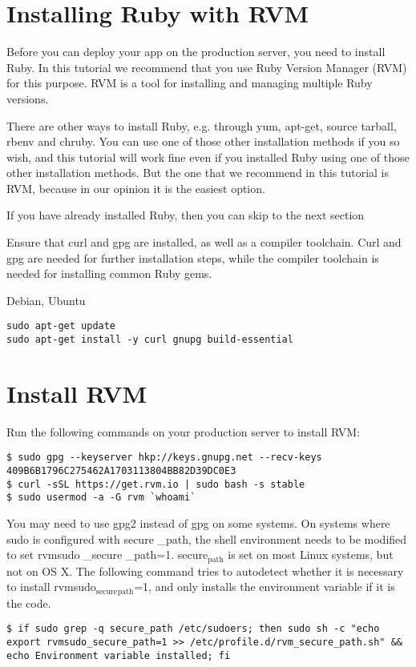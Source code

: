 \documentclass[11pt]{article}
\author{Justin}
\date{\today}
\title{}
\begin{document}
\tableofcontents

\section{Installing Ruby with RVM}
\label{sec:org7777b3d}
Before you can deploy your app on the production server, you need to install Ruby. In this tutorial we recommend that you use Ruby Version Manager (RVM) for this purpose. RVM is a tool for installing and managing multiple Ruby versions.

There are other ways to install Ruby, e.g. through yum, apt-get, source tarball, rbenv and chruby. You can use one of those other installation methods if you so wish, and this tutorial will work fine even if you installed Ruby using one of those other installation methods. But the one that we recommend in this tutorial is RVM, because in our opinion it is the easiest option.

If you have already installed Ruby, then you can skip to the next section

Ensure that curl and gpg are installed, as well as a compiler toolchain. Curl and gpg are needed for further installation steps, while the compiler toolchain is needed for installing common Ruby gems.

Debian, Ubuntu	
\begin{verbatim}
sudo apt-get update
sudo apt-get install -y curl gnupg build-essential
\end{verbatim}
\section{Install RVM}
\label{sec:org85ccdf1}

Run the following commands on your production server to install RVM:

\begin{verbatim}
$ sudo gpg --keyserver hkp://keys.gnupg.net --recv-keys 409B6B1796C275462A1703113804BB82D39DC0E3
$ curl -sSL https://get.rvm.io | sudo bash -s stable
$ sudo usermod -a -G rvm `whoami`
\end{verbatim}

You may need to use gpg2 instead of gpg on some systems.
On systems where sudo is configured with secure \_path, the shell environment needs to be modified to set rvmsudo \_secure \_path=1. secure\(_{\text{path}}\) is set on most Linux systems, but not on OS X. The following command tries to autodetect whether it is necessary to install rvmsudo\(_{\text{secure}}\)\(_{\text{path}}\)=1, and only installs the environment variable if it is the code.
\begin{verbatim}
$ if sudo grep -q secure_path /etc/sudoers; then sudo sh -c "echo export rvmsudo_secure_path=1 >> /etc/profile.d/rvm_secure_path.sh" && echo Environment variable installed; fi
\end{verbatim}
\end{document}
